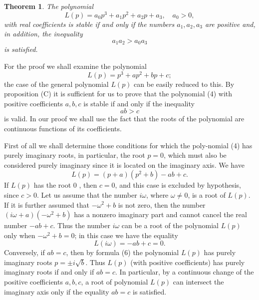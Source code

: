 \documentclass[10pt,a5paper]{book}
\makeatletter
\theoremstyle{plain}
\newtheorem{theorem}{Theorem}
\theoremstyle{definition}
\theoremstyle{remark}
\renewenvironment{proof}[1][\proofname]{\par
  \pushQED{\qed}%
  \normalfont\topsep6\p@\@plus6\p@\relax
  \trivlist
  \item\relax{\itshape #1\@addpunct{.}}\hspace\labelsep\ignorespaces
}{\popQED\endtrivlist\@endpefalse}
\makeatother
\begin{document}
\begin{theorem}
The polynomial
\[
L(p)=a_{0} p^{3}+a_{1} p^{2}+a_{2} p+a_{3}, \quad a_{0}>0,
\]
with real coefficients is stable if and only if the numbers $a_{1}, a_{2}, a_{3}$ are
positive and, in addition, the inequality
\[
a_{1} a_{2}>a_{0} a_{3}
\]
is satisfied.
\end{theorem}
\begin{proof}
For the proof we shall examine the polynomial
\begin{equation*}
L(p)=p^{3}+a p^{2}+b p+c ; \tag{4}
\end{equation*}
the case of the general polynomial $L(p)$ can be easily reduced to this. By proposition (C) it is sufficient for us to prove that the polynomial (4) with positive coefficients $a, b, c$ is stable if and only if the inequality
\begin{equation*}
a b>c \tag{5}
\end{equation*}
is valid. In our proof we shall use the fact that the roots of the polynomial are continuous functions of its coefficients.

First of all we shall determine those conditions for which the poly-nomial (4) has purely imaginary roots, in particular, the root $p=0$, which must also be considered purely imaginary since it is located on the imaginary axis. We have
\begin{equation*}
L(p)=(p+a)\left(p^{2}+b\right)-a b+c . \tag{6}
\end{equation*}
If $L(p)$ has the root 0 , then $c=0$, and this case is excluded by hypothesis, since $c>0$. Let us assume that the number $i \omega$, where $\omega \neq 0$, is a root of $L(p)$. If it is further assumed that $-\omega^{2}+b$ is not zero, then the number $(i \omega+a)\left(-\omega^{2}+b\right)$ has a nonzero imaginary part and cannot cancel the real number $-a b+c$. Thus the number $i \omega$ can be a root of the polynomial $L(p)$ only when $-\omega^{2}+b=0$; in this case we have the equality
\[
L(i \omega)=-a b+c=0 .
\]
Conversely, if $a b=c$, then by formula (6) the polynomial $L(p)$ has purely imaginary roots $p= \pm i \sqrt{b}$. Thus $L(p)$ (with positive coefficients) has purely imaginary roots if and only if $a b=c$. In particular, by a continuous change of the positive coefficients $a, b, c$, a root of polynomial $L(p)$ can intersect the imaginary axis only if the equality $a b=c$ is satisfied.


\end{proof}
\end{document}
